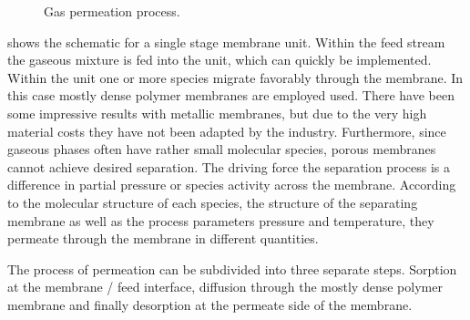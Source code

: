\begin{figure}
	\center
	
	\caption{Gas permeation process.}
	\label{fig:gas_permeation} 
\end{figure}

 shows the schematic for a single stage membrane unit. Within the feed stream 
the gaseous mixture is fed into the unit, which can quickly be implemented. Within the unit one or more 
species migrate favorably through the membrane. In this case mostly dense polymer membranes are 
employed used. There have been some impressive results with metallic membranes, but due to 
the very high material costs they have not been adapted by the industry. Furthermore, since gaseous 
phases often have rather small molecular species, porous membranes cannot achieve desired separation. 
The driving force the separation process is a difference in partial pressure or species activity across the 
membrane. According to the molecular structure of each species, the structure of the separating membrane 
as well as the process parameters pressure and temperature, they permeate through the membrane in 
different quantities.

The process of permeation can be subdivided into three separate steps. Sorption at the membrane / 
feed interface, diffusion through the mostly dense polymer membrane and finally desorption at the 
permeate side of the membrane. 
